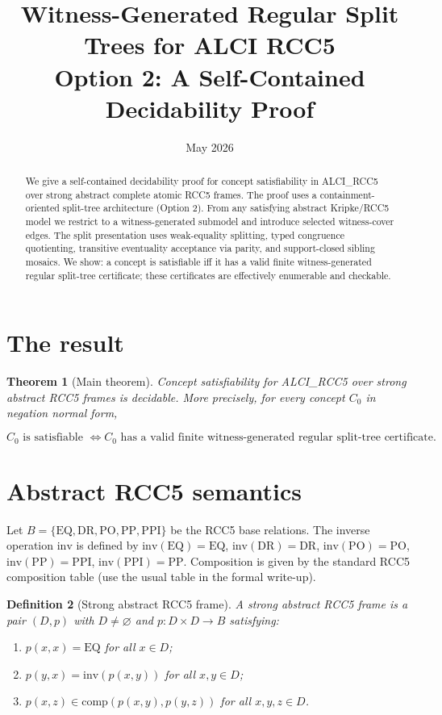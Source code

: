 \documentclass[11pt]{article}
\title{Witness-Generated Regular Split Trees for ALCI RCC5\\
Option 2: A Self-Contained Decidability Proof}
\author{May 2026}
\date{}
\newcommand{\PP}{\mathrm{PP}}
\newcommand{\PPI}{\mathrm{PPI}}
\newcommand{\EQ}{\mathrm{EQ}}
\newcommand{\DR}{\mathrm{DR}}
\newcommand{\PO}{\mathrm{PO}}
\newtheorem{theorem}{Theorem}[section]
\newtheorem{definition}[theorem]{Definition}
\begin{document}
\maketitle

\begin{abstract}
We give a self-contained decidability proof for concept satisfiability in
ALCI\_RCC5 over strong abstract complete atomic RCC5 frames. The proof uses a
containment-oriented split-tree architecture (Option 2). From any satisfying
abstract Kripke/RCC5 model we restrict to a witness-generated submodel and
introduce selected witness-cover edges. The split presentation uses weak-equality
splitting, typed congruence quotienting, transitive eventuality acceptance via
parity, and support-closed sibling mosaics. We show: a concept is satisfiable
iff it has a valid finite witness-generated regular split-tree certificate;
these certificates are effectively enumerable and checkable.
\end{abstract}

\tableofcontents

\section{The result}
\label{sec:result}

\begin{theorem}[Main theorem]
Concept satisfiability for ALCI\_RCC5 over strong abstract RCC5 frames is
decidable. More precisely, for every concept $C_0$ in negation normal form,


\[
C_0 \text{ is satisfiable } \iff C_0 \text{ has a valid finite witness-generated regular split-tree certificate.}
\]


\end{theorem}

\section{Abstract RCC5 semantics}
\label{sec:rcc5}

Let $B=\{\EQ,\DR,\PO,\PP,\PPI\}$ be the RCC5 base relations. The inverse
operation $\mathrm{inv}$ is defined by $\mathrm{inv}(\EQ)=\EQ$,
$\mathrm{inv}(\DR)=\DR$, $\mathrm{inv}(\PO)=\PO$, $\mathrm{inv}(\PP)=\PPI$,
$\mathrm{inv}(\PPI)=\PP$. Composition is given by the standard RCC5 composition
table (use the usual table in the formal write-up).

\begin{definition}[Strong abstract RCC5 frame]
A strong abstract RCC5 frame is a pair $(D,p)$ with $D\neq\varnothing$ and
$p:D\times D\to B$ satisfying:
\begin{enumerate}[label=(F\arabic*)]
  \item $p(x,x)=\EQ$ for all $x\in D$;
  \item $p(y,x)=\mathrm{inv}(p(x,y))$ for all $x,y\in D$;
  \item $p(x,z)\in\mathrm{comp}(p(x,y),p(y,z))$ for all $x,y,z\in D$.
\end{enumerate}
\end{definition}
\end{document}
